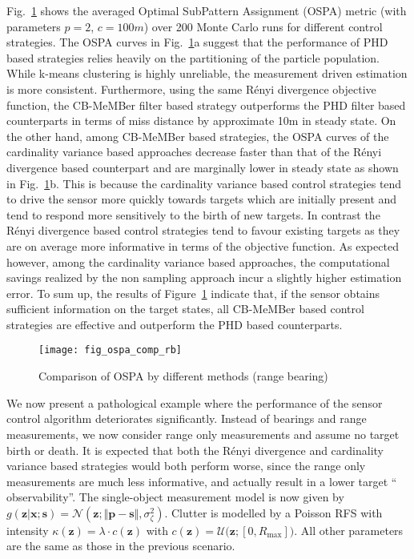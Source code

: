 \documentclass[twocolumn]{autart}
\begin{document}
Fig.~\ref{fig2} shows the averaged Optimal SubPattern Assignment (OSPA) metric \cite{SVV08} (with parameters $p=2$, $c=100m$) over 200 Monte Carlo runs for different control strategies. The OSPA curves in Fig.~\ref{fig2}a suggest that the performance of PHD based strategies relies heavily on the partitioning of the particle population. While k-means clustering is highly unreliable, the measurement driven estimation \cite{RVC11} is more consistent. Furthermore, using the same R\'enyi divergence objective function, the CB-MeMBer filter based strategy outperforms the PHD filter based counterparts in terms of miss distance by approximate 10m in steady state. On the other hand, among CB-MeMBer based strategies, the OSPA curves of the cardinality variance based approaches decrease faster than that of the R\'{e}nyi divergence based counterpart and are marginally lower in steady state as shown in Fig.~\ref{fig2}b. This is because the cardinality variance based control strategies tend to drive the sensor more quickly towards targets which are initially present and tend to respond more sensitively to the birth of new targets. In contrast the R\'enyi divergence based control strategies tend to favour existing targets as they are on average more informative in terms of the objective function. As expected however, among the cardinality variance based approaches, the computational savings realized by the non sampling approach incur a slightly higher estimation error. To sum up, the results of Figure~\ref{fig2} indicate that, if the sensor obtains sufficient information on the target states, all CB-MeMBer based control strategies are effective and outperform the PHD based counterparts.
\begin{figure}[htb]
\centering
\texttt{[image: fig\_ospa\_comp\_rb]}
\caption{Comparison of OSPA by different methods (range bearing)}
\label{fig2}
\end{figure}

We now present a pathological example where the performance of the sensor
control algorithm deteriorates significantly. Instead of bearings and range
measurements, we now consider range only measurements and assume no target birth or death. It is expected that
both the R\'{e}nyi divergence and cardinality variance based strategies
would both perform worse, since the range only measurements are much less
informative, and actually result in a lower target \textquotedblleft
observability\textquotedblright . The single-object measurement model is now
given by $g(\mathbf{z}|\mathbf{x};\mathbf{s})=\mathcal{N}(\mathbf{z};\Vert \mathbf{p}-\mathbf{s}\Vert ,\sigma _{\zeta }^{2})$. Clutter is modelled by a Poisson
RFS with intensity $\kappa (\mathbf{z})=\lambda \cdot c(\mathbf{z})$ with $c(\mathbf{z})=\mathcal{U(}\mathbf{z};[0,R_{\text{max}}])$. All other
parameters are the same as those in the previous scenario.
\end{document}

